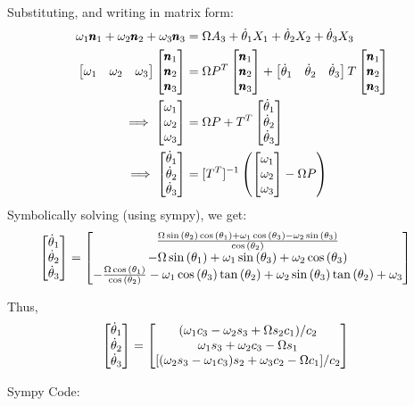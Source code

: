Substituting, and writing in matrix form:
\begin{align*}
    \omega_1 \pmb n_1 + \omega_2 \pmb n_2 + \omega_3 \pmb n_3 &= \Omega A_3 +\dot \theta_1 X_1 + \dot \theta_2 X_2 + \dot \theta_3 X_3\\
    \begin{bmatrix} \omega_1 & \omega_2 & \omega_3 \end{bmatrix}  \begin{bmatrix} \pmb n_1 \\ \pmb n_2 \\ \pmb n_3 \end{bmatrix}
    &= \Omega P^T  \begin{bmatrix} \pmb n_1 \\ \pmb n_2 \\ \pmb n_3 \end{bmatrix}
        + \begin{bmatrix} \dot \theta_1 & \dot \theta_2 & \dot \theta_3 \end{bmatrix} T \begin{bmatrix} \pmb n_1 \\ \pmb n_2 \\ \pmb n_3 \end{bmatrix}\\
    \implies \begin{bmatrix} \omega_1 \\ \omega_2 \\ \omega_3 \end{bmatrix} &= \Omega P + T^T  \begin{bmatrix} \dot \theta_1 \\ \dot \theta_2 \\ \dot \theta_3 \end{bmatrix}\\
    \implies \begin{bmatrix} \dot \theta_1 \\ \dot \theta_2 \\ \dot \theta_3 \end{bmatrix} &= [T^T]^{-1} \left(\begin{bmatrix} \omega_1 \\ \omega_2 \\ \omega_3 \end{bmatrix} - \Omega P \right)
\end{align*}
Symbolically solving (using sympy), we get:
\begin{align*}
    \begin{bmatrix} \dot \theta_1 \\ \dot \theta_2 \\ \dot \theta_3 \end{bmatrix}&=
    \left[\begin{matrix}\frac{\Omega \sin{\left(\theta_{2} \right)} \cos{\left(\theta_{1} \right)} + \omega_{1} \cos{\left(\theta_{3} \right)} - \omega_{2} \sin{\left(\theta_{3} \right)}}{\cos{\left(\theta_{2} \right)}}\\- \Omega \sin{\left(\theta_{1} \right)} + \omega_{1} \sin{\left(\theta_{3} \right)} + \omega_{2} \cos{\left(\theta_{3} \right)}\\- \frac{\Omega \cos{\left(\theta_{1} \right)}}{\cos{\left(\theta_{2} \right)}} - \omega_{1} \cos{\left(\theta_{3} \right)} \tan{\left(\theta_{2} \right)} + \omega_{2} \sin{\left(\theta_{3} \right)} \tan{\left(\theta_{2} \right)} + \omega_{3}\end{matrix}\right]
\end{align*}

Thus,
\begin{align*}
    \begin{bmatrix} \dot \theta_1 \\ \dot \theta_2 \\ \dot \theta_3 \end{bmatrix}&=
    \begin{bmatrix} (\omega_1 c_3 - \omega_2 s_3 + \Omega s_2 c_1)/c_2 \\
        \omega_1 s_3 + \omega_2 c_3 - \Omega s_1 \\
        [(\omega_2 s_3 - \omega_1 c_3)s_2 + \omega_3 c_2 - \Omega c_1]/c_2 \end{bmatrix}
\end{align*}

Sympy Code:

